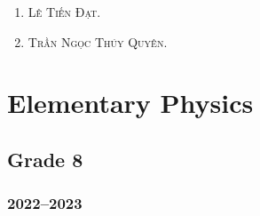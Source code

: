 \documentclass{article}
\begin{document}
\begin{enumerate}
	\item \textsc{Lê Tiến Đạt.}
	\item \textsc{Trần Ngọc Thúy Quyên.}
\end{enumerate}


\section{Elementary Physics}

\subsection{Grade 8}

\subsubsection{2022--2023}
\end{document}
